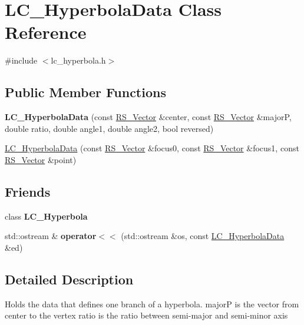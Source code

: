\hypertarget{classLC__HyperbolaData}{\section{L\-C\-\_\-\-Hyperbola\-Data Class Reference}
\label{classLC__HyperbolaData}
}


{\ttfamily \#include $<$lc\-\_\-hyperbola.\-h$>$}

\subsection*{Public Member Functions}
\begin{DoxyCompactItemize}
\item 
\hypertarget{classLC__HyperbolaData_ae8f1e02a8f724304cd9fb67e49cdf5bb}{{\bfseries L\-C\-\_\-\-Hyperbola\-Data} (const \hyperlink{classRS__Vector}{R\-S\-\_\-\-Vector} \&center, const \hyperlink{classRS__Vector}{R\-S\-\_\-\-Vector} \&major\-P, double ratio, double angle1, double angle2, bool reversed)}\label{classLC__HyperbolaData_ae8f1e02a8f724304cd9fb67e49cdf5bb}

\item 
\hyperlink{classLC__HyperbolaData_abff42b4a687c050850430b79982da473}{L\-C\-\_\-\-Hyperbola\-Data} (const \hyperlink{classRS__Vector}{R\-S\-\_\-\-Vector} \&focus0, const \hyperlink{classRS__Vector}{R\-S\-\_\-\-Vector} \&focus1, const \hyperlink{classRS__Vector}{R\-S\-\_\-\-Vector} \&point)
\end{DoxyCompactItemize}
\subsection*{Friends}
\begin{DoxyCompactItemize}
\item 
\hypertarget{classLC__HyperbolaData_a94787ad192b04f9702692fff14e1145d}{class {\bfseries L\-C\-\_\-\-Hyperbola}}\label{classLC__HyperbolaData_a94787ad192b04f9702692fff14e1145d}

\item 
\hypertarget{classLC__HyperbolaData_a184c667dccd5d3ec327617cad68600cb}{std\-::ostream \& {\bfseries operator$<$$<$} (std\-::ostream \&os, const \hyperlink{classLC__HyperbolaData}{L\-C\-\_\-\-Hyperbola\-Data} \&ed)}\label{classLC__HyperbolaData_a184c667dccd5d3ec327617cad68600cb}

\end{DoxyCompactItemize}


\subsection{Detailed Description}
Holds the data that defines one branch of a hyperbola. major\-P is the vector from center to the vertex ratio is the ratio between semi-\/major and semi-\/minor axis 

